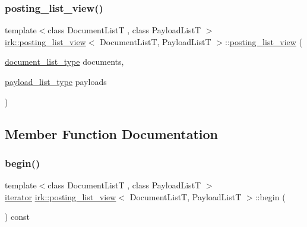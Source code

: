 \subsubsection{\texorpdfstring{posting\+\_\+list\+\_\+view()}{posting\_list\_view()}}
{\footnotesize\ttfamily template$<$class Document\+ListT , class Payload\+ListT $>$ \\
\mbox{\hyperlink{classirk_1_1posting__list__view}{irk\+::posting\+\_\+list\+\_\+view}}$<$ Document\+ListT, Payload\+ListT $>$\+::\mbox{\hyperlink{classirk_1_1posting__list__view}{posting\+\_\+list\+\_\+view}} (\begin{DoxyParamCaption}\item[{\mbox{\hyperlink{classirk_1_1posting__list__view_ae024545dbbb464926a2024d956b7b7af}{document\+\_\+list\+\_\+type}}}]{documents,  }\item[{\mbox{\hyperlink{classirk_1_1posting__list__view_aabf1afcb3a994971f30879354301e1fe}{payload\+\_\+list\+\_\+type}}}]{payloads }\end{DoxyParamCaption})\hspace{0.3cm}{\ttfamily [inline]}}



\subsection{Member Function Documentation}
\mbox{\label{classirk_1_1posting__list__view_a62065bb4544ebf8d6425b608a0852c11}} 
\subsubsection{\texorpdfstring{begin()}{begin()}}
{\footnotesize\ttfamily template$<$class Document\+ListT , class Payload\+ListT $>$ \\
\mbox{\hyperlink{classirk_1_1posting__list__view_1_1iterator}{iterator}} \mbox{\hyperlink{classirk_1_1posting__list__view}{irk\+::posting\+\_\+list\+\_\+view}}$<$ Document\+ListT, Payload\+ListT $>$\+::begin (\begin{DoxyParamCaption}{ }\end{DoxyParamCaption}) const\hspace{0.3cm}{\ttfamily [inline]}}

\mbox{\label{classirk_1_1posting__list__view_a57999e9c9b9347a86b242147fbd930b7}} 
